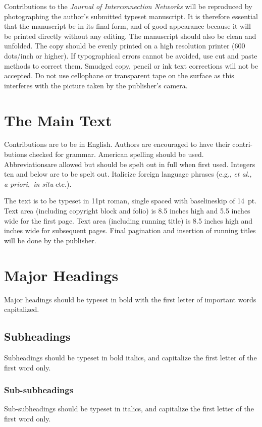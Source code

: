 \documentclass{ws-join}
\begin{document}
Contributions to the {\it Journal of Interconnection Networks\/} will 
be reproduced by photographing the author's submitted typeset
manuscript. It is therefore essential that the manuscript be in its 
final form, and of good appearance because it will be printed directly
without any editing. The manuscript should also be clean and
unfolded. The copy should be evenly printed on a high resolution
printer (600 dots/inch or higher).  If typographical errors cannot be
avoided, use cut and paste methods to correct them. Smudged copy,
pencil or ink text corrections will not be accepted. Do not use
cellophane or transparent tape on the surface as this interferes with
the picture taken by the publisher's camera.

\section{The Main Text}
Contributions are to be in English. Authors are encouraged to have
their contri-\break butions checked for grammar. American spelling
should be used. Abbreviations\break are allowed but should be spelt
out in full when first used. Integers ten and below are to be spelt
out. Italicize foreign language phrases (e.g., {\it et al.$,$ a
priori$,$ in situ} etc.).

The text is to be typeset in 11pt roman, single spaced with
baselineskip of 14~pt. Text area (including copyright block and folio)
is 8.5 inches high and 5.5 inches wide for the first page.  Text area
(including running title) is 8.5 inches high and inches wide
for subsequent pages. Final pagination and insertion of running titles
will be done by the publisher.

\section{Major Headings}
Major headings should be typeset in bold with the first letter of  
important words capitalized.

\subsection{Subheadings}
Subheadings should be typeset in bold italics, and capitalize the first 
letter of the first word only.

\subsubsection{Sub-subheadings}
Sub-subheadings should be typeset in italics, and capitalize the first
letter of the first word only.
\end{document}
